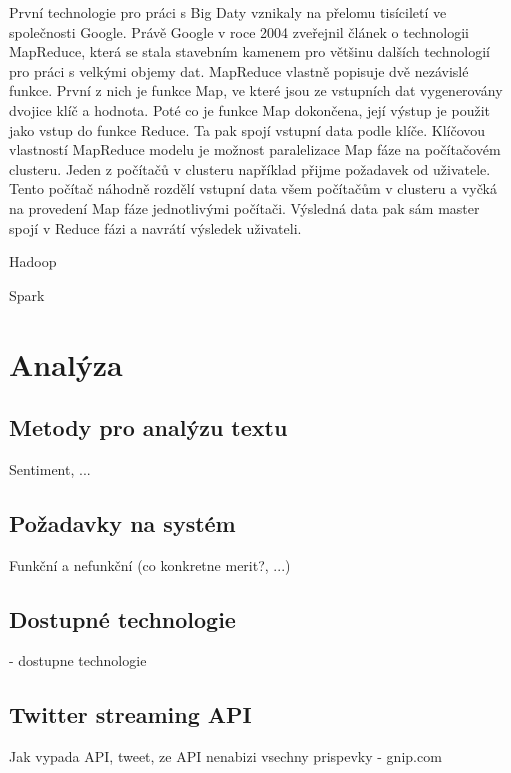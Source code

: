 \documentclass[thesis=B,czech]{FITthesis}[2012/06/26]
\begin{document}
	První technologie pro práci s Big Daty vznikaly na přelomu tisíciletí ve společnosti Google. Právě Google v roce 2004 zveřejnil článek o technologii MapReduce\cite{https://gigaom.com/2013/03/04/the-history-of-hadoop-from-4-nodes-to-the-future-of-data/}, která se stala stavebním kamenem pro většinu dalších technologií pro práci s velkými objemy dat. MapReduce vlastně popisuje dvě nezávislé funkce. První z nich je funkce Map, ve které jsou ze vstupních dat vygenerovány dvojice klíč a hodnota. Poté co je funkce Map dokončena, její výstup je použit jako vstup do funkce Reduce. Ta pak spojí vstupní data podle klíče\cite{https://www-01.ibm.com/software/data/infosphere/hadoop/mapreduce/}. Klíčovou vlastností MapReduce modelu je možnost paralelizace Map fáze na počítačovém clusteru. Jeden z počítačů v clusteru například přijme požadavek od uživatele. Tento počítač náhodně rozdělí vstupní data všem počítačům v clusteru a vyčká na provedení Map fáze jednotlivými počítači. Výsledná data pak sám master spojí v Reduce fázi a navrátí výsledek uživateli. 
	
	Hadoop
	
	Spark





\chapter{Analýza}
\section{Metody pro analýzu textu}
	Sentiment, ...

\section{Požadavky na systém}
	Funkční a nefunkční (co konkretne merit?, ...)

\section{Dostupné technologie}
	- dostupne technologie

\section{Twitter streaming API}
	Jak vypada API, tweet, ze API nenabizi vsechny prispevky - gnip.com
\end{document}
